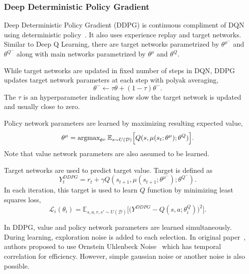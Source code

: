 \subsubsection{Deep Deterministic Policy Gradient}
Deep Deterministic Policy Gradient (DDPG) is continuous compliment of DQN using deterministic policy~\cite{lillicrap_continuous_2019}. 
It also uses experience replay and target networks. 
Similar to Deep Q Learning, there are target networks parametrized by $\theta^{\mu^-}$ and $\theta^{Q^-}$ 
along with main networks parametrized by $\theta^{\mu}$ and $\theta^{Q}$. 

While target networks are updated in fixed number of steps in DQN, 
DDPG updates target network parameters at each step with polyak averaging, 
\begin{equation}
\label{eqn:target_update}
\theta^- \leftarrow \tau \theta + (1-\tau) \theta^- .
\end{equation}
The $\tau$ is an hyperparameter indicating how slow the target network is updated and usually close to zero. 

Policy network parameters are learned by maximizing resulting expected value,
\begin{equation}
\label{eqn:ddpg_value_maximization}
\theta^\mu = \operatorname{\textup{argmax}}_{\theta^\mu} \mathbb{E}_{s \sim U(\mathcal{D})} \Big[ Q(s, \mu(s_t;\theta^\mu);\theta^Q) \Big].
\end{equation} 
Note that value network parameters are also assumed to be learned. 

Target networks are used to predict target value. Target is defined as 
\begin{equation}
\label{eqn:ddpg_target}
Y_t^{DDPG} = r_t + \gamma Q(s_{t+1}, \mu(s_{t+1};\theta^{\mu^-});\theta^{Q^-}).
\end{equation}
In each iteration, this target is used to learn $Q$ function by minimizing least squares loss, 
\begin{equation}
\label{eqn:ddpg_loss}
\mathcal{L}_i(\theta_i) = \mathbb{E}_{s,a,r,s'\sim U(\mathcal{D})}\Big[\big( Y^{DDPG} - Q(s,a;\theta^Q_i) \big) ^ 2 \Big].
\end{equation}

In DDPG, value and policy network parameters are learned simultaneously. 
During learning, exploration noise is added to each selection. 
In original paper~\cite{lillicrap_continuous_2019}, authors proposed to use Ornstein Uhlenbeck Noise~\cite{uhlenbeck_theory_1930} which has temporal correlation for efficiency. 
However, simple gaussian noise or another noise is also possible. 


